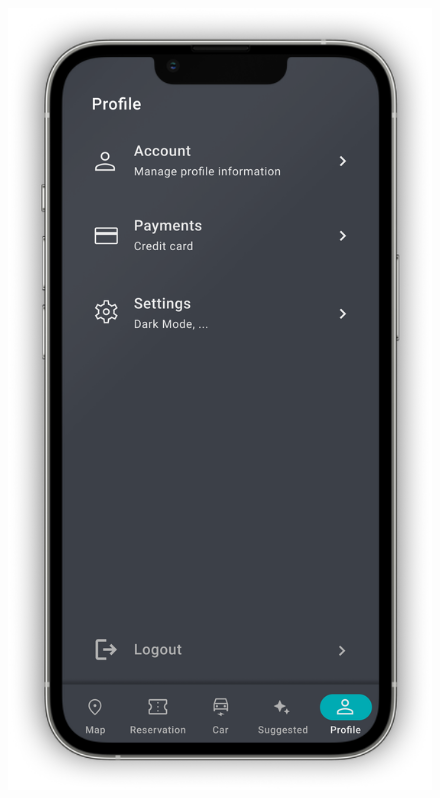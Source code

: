 \begin{figure}[H]
{        \includegraphics[scale=0.32]{src/mockups/profile.png}
    }
\end{figure}

